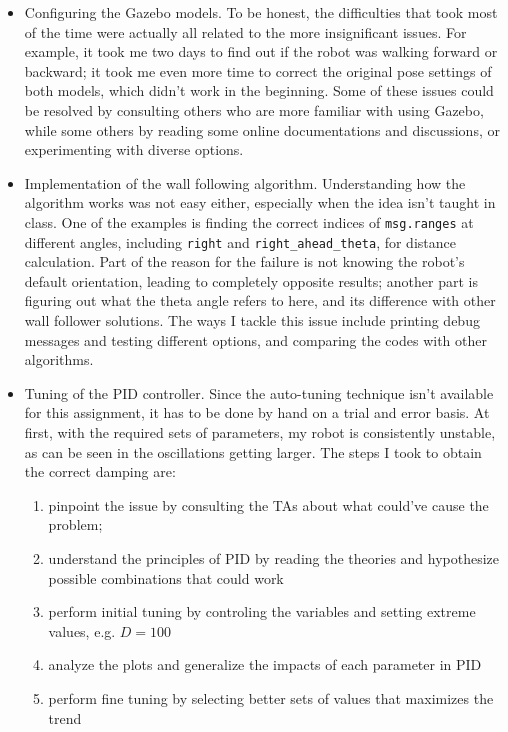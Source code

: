 \documentclass[12pt]{article}
\begin{document}
\begin{enumerate}
    \begin{itemize}
        \item Configuring the Gazebo models. To be honest, the difficulties that took most of the time were actually all related to the more insignificant issues. For example, it took me two days to find out if the robot was walking forward or backward; it took me even more time to correct the original pose settings of both models, which didn't work in the beginning. Some of these issues could be resolved by consulting others who are more familiar with using Gazebo, while some others by reading some online documentations and discussions, or experimenting with diverse options.
        \item Implementation of the wall following algorithm. Understanding how the algorithm works was not easy either, especially when the idea isn't taught in class. One of the examples is finding the correct indices of \texttt{msg.ranges} at different angles, including \texttt{right} and \texttt{right_ahead_theta}, for distance calculation. Part of the reason for the failure is not knowing the robot's default orientation, leading to completely opposite results; another part is figuring out what the theta angle refers to here, and its difference with other wall follower solutions. The ways I tackle this issue include printing debug messages and testing different options, and comparing the codes with other algorithms.
        \item Tuning of the PID controller. Since the auto-tuning technique isn't available for this assignment, it has to be done by hand on a trial and error basis. At first, with the required sets of parameters, my robot is consistently unstable, as can be seen in the oscillations getting larger. The steps I took to obtain the correct damping are:
        
        \begin{enumerate}
            \item pinpoint the issue by consulting the TAs about what could've cause the problem;
            \item understand the principles of PID by reading the theories and hypothesize possible combinations that could work
            \item perform initial tuning by controling the variables and setting extreme values, e.g. $D=100$
            \item analyze the plots and generalize the impacts of each parameter in PID
            \item perform fine tuning by selecting better sets of values that maximizes the trend
        \end{enumerate}


\end{itemize}
\end{enumerate}
\end{document}
